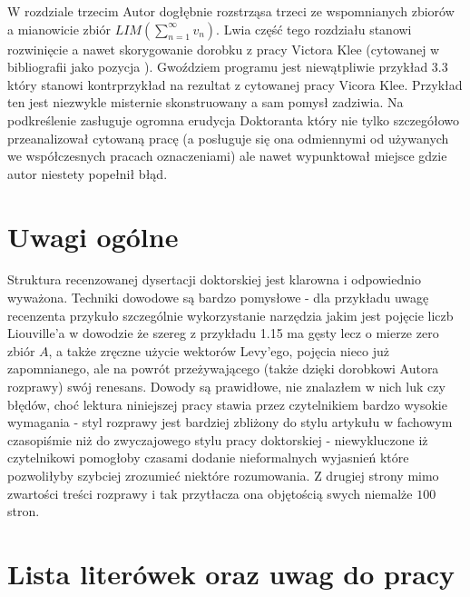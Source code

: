 \documentclass[12pt]{article}
\begin{document}
  W rozdziale trzecim Autor dogłębnie rozstrząsa 
trzeci ze wspomnianych zbiorów a mianowicie
zbiór $LIM(\sum_{n=1}^\infty v_n)$. Lwia część 
tego rozdziału stanowi rozwinięcie a nawet
skorygowanie dorobku z pracy Victora Klee
(cytowanej w bibliografii jako pozycja \big[28\big]).
Gwoździem programu jest niewątpliwie przykład
3.3 który stanowi kontrprzykład na rezultat
z cytowanej pracy Vicora Klee. Przykład ten
jest niezwykle misternie skonstruowany a
sam pomysł zadziwia. Na podkreślenie zasługuje 
ogromna erudycja Doktoranta który nie tylko
szczegółowo przeanalizował cytowaną
pracę (a posługuje się ona odmiennymi od 
używanych we współczesnych pracach oznaczeniami)
ale nawet wypunktował miejsce gdzie autor 
niestety popełnił błąd.

\section{Uwagi ogólne}

  Struktura recenzowanej dysertacji doktorskiej jest
klarowna i odpowiednio wyważona. Techniki dowodowe 
są bardzo pomysłowe - dla przykładu uwagę recenzenta 
przykuło szczególnie wykorzystanie narzędzia jakim jest
pojęcie liczb Liouville'a w dowodzie że szereg z przykładu
1.15 ma gęsty lecz o mierze zero zbiór $A$, a także
zręczne użycie wektorów Levy'ego, pojęcia nieco już 
zapomnianego, ale na powrót 
przeżywającego (także dzięki dorobkowi Autora rozprawy) 
swój renesans. 
  Dowody są prawidłowe, nie znalazłem w nich luk czy 
błędów, choć lektura niniejszej pracy stawia przez
czytelnikiem bardzo wysokie wymagania - styl rozprawy
jest bardziej zbliżony do stylu artykułu w fachowym czasopiśmie
niż do zwyczajowego stylu pracy doktorskiej - niewykluczone
iż czytelnikowi pomogłoby czasami dodanie nieformalnych
wyjasnień które pozwoliłyby szybciej zrozumieć niektóre 
rozumowania. Z drugiej strony mimo zwartości treści 
rozprawy i tak przytłacza ona objętością swych niemalże
$100$ stron.


\section{Lista literówek oraz uwag do pracy}
\end{document}

